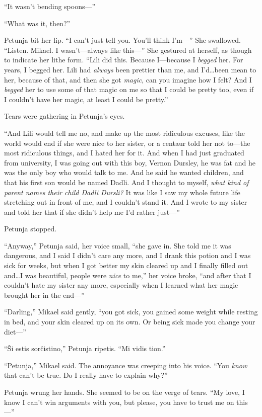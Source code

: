 “It wasn’t bending spoons—”

“What was it, then?”

Petunja bit her lip. “I can’t just tell you. You’ll think I’m—” She swallowed. “Listen. Mikael. I wasn’t—always like this—” She gestured at herself, as though to indicate her lithe form. “Lili did this. Because I—because I \emph{begged} her. For years, I begged her. Lili had \emph{always} been prettier than me, and I’d…been mean to her, because of that, and then she got \emph{magic}, can you imagine how I felt? And I \emph{begged} her to use some of that magic on me so that I could be pretty too, even if I couldn’t have her magic, at least I could be pretty.”

Tears were gathering in Petunja’s eyes.

“And Lili would tell me no, and make up the most ridiculous excuses, like the world would end if she were nice to her sister, or a centaur told her not to—the most ridiculous things, and I hated her for it. And when I had just graduated from university, I was going out with this boy, Vernon Dursley, he was fat and he was the only boy who would talk to me. And he said he wanted children, and that his first son would be named Dadli. And I thought to myself, \emph{what kind of parent names their child Dadli Dursli?} It was like I saw my whole future life stretching out in front of me, and I couldn’t stand it. And I wrote to my sister and told her that if she didn’t help me I’d rather just—”

Petunja stopped.

“Anyway,” Petunja said, her voice small, “she gave in. She told me it was dangerous, and I said I didn’t care any more, and I drank this potion and I was sick for weeks, but when I got better my skin cleared up and I finally filled out and…I was beautiful, people were \emph{nice} to me,” her voice broke, “and after that I couldn’t hate my sister any more, especially when I learned what her magic brought her in the end—”

“Darling,” Mikael said gently, “you got sick, you gained some weight while resting in bed, and your skin cleared up on its own. Or being sick made you change your diet—”

“Ŝi estis sorĉistino,” Petunja ripetis. “Mi vidis tion.”

“Petunja,” Mikael said. The annoyance was creeping into his voice. “You \emph{know} that can’t be true. Do I really have to explain why?”

Petunja wrung her hands. She seemed to be on the verge of tears. “My love, I know I can’t win arguments with you, but please, you have to trust me on this—”

